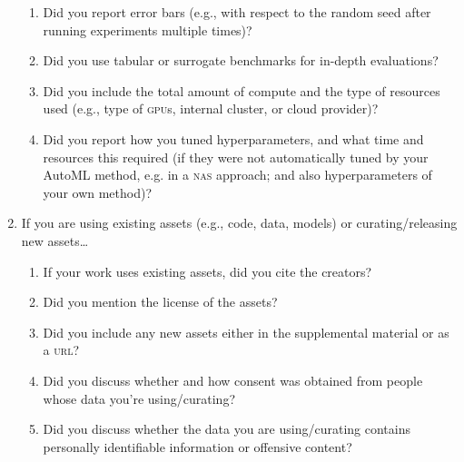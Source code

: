 \documentclass[11pt]{article}
\begin{document}
\begin{enumerate}
\begin{enumerate}
  \item Did you report error bars (e.g., with respect to the random seed after
    running experiments multiple times)?
  \item Did you use tabular or surrogate benchmarks for in-depth evaluations?
  \item Did you include the total amount of compute and the type of resources
    used (e.g., type of \textsc{gpu}s, internal cluster, or cloud provider)?
  \item Did you report how you tuned hyperparameters, and what time and
    resources this required (if they were not automatically tuned by your AutoML
    method, e.g. in a \textsc{nas} approach; and also hyperparameters of your
    own method)?
  \end{enumerate}
\item If you are using existing assets (e.g., code, data, models) or
  curating/releasing new assets\dots
  \begin{enumerate}
  \item If your work uses existing assets, did you cite the creators?
  \item Did you mention the license of the assets?
  \item Did you include any new assets either in the supplemental material or as
    a \textsc{url}?
  \item Did you discuss whether and how consent was obtained from people whose
    data you're using/curating?
  \item Did you discuss whether the data you are using/curating contains
    personally identifiable information or offensive content?
  \end{enumerate}

\end{enumerate}
\end{document}
